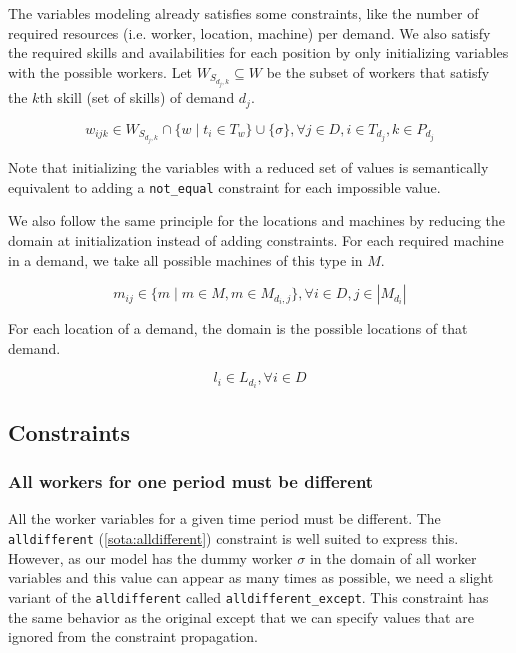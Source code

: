 \documentclass[../../thesis.tex]{subfiles}
\begin{document}
The variables modeling already satisfies some constraints, like the number of required resources (i.e. worker, location, machine)
per demand. We also satisfy the required skills and availabilities for each position by only initializing variables with the 
possible workers. Let $W_{S_{d_j,k}} \subseteq W$ be the subset of workers that satisfy the $k$th skill (set of skills) of demand $d_j$.

\begin{equation}
  \label{wdomain}
  w_{ijk} \in W_{S_{d_j,k}} \cap \{ w \mid t_i \in T_w \} \cup \{ \sigma \}, \forall j \in D, i \in T_{d_j}, k \in P_{d_j}
\end{equation}

Note that initializing the variables with a reduced set of values is semantically equivalent to adding a \texttt{not\_equal} constraint for each impossible value.


We also follow the same principle for the locations and machines by reducing the domain at initialization instead of adding constraints.
For each required machine in a demand, we take all possible machines of this type in $M$.

\begin{equation}
  \label{mdomain}
  m_{ij} \in \{ m \mid m \in M, m \in M_{{d_i},j}  \}, \forall i \in D, j \in |M_{d_i}|
\end{equation}

For each location of a demand, the domain is the possible locations of that demand.

\begin{equation}
  \label{ldomain}
  l_i \in L_{d_i}, \forall i \in D
\end{equation}


\subsection{Constraints}

\subsubsection{All workers for one period must be different}

All the worker variables for a given time period must be different. 
The \texttt{alldifferent} (\autoref{sota:alldifferent}) constraint is well suited to express this. 
However, as our model has the dummy worker $\sigma$ in the domain of all worker variables and this value 
can appear as many times as possible, we need a slight variant of the \texttt{alldifferent} called \texttt{alldifferent\_except}. 
This constraint has the same behavior as the original except that we can specify values that are ignored from 
the constraint propagation.
\end{document}
